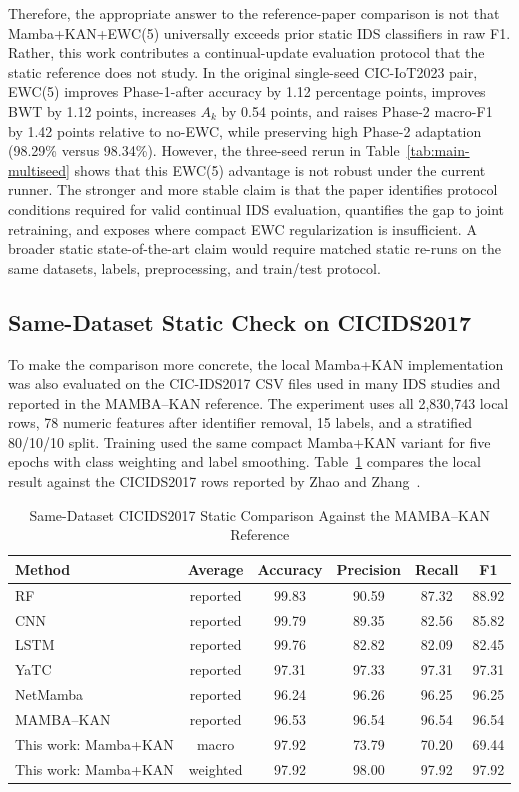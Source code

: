 \documentclass[a4paper,fleqn]{cas-dc}
\begin{document}
Therefore, the appropriate answer to the reference-paper comparison is not that Mamba+KAN+EWC(5) universally exceeds prior static IDS classifiers in raw F1. Rather, this work contributes a continual-update evaluation protocol that the static reference does not study. In the original single-seed CIC-IoT2023 pair, EWC(5) improves Phase-1-after accuracy by 1.12 percentage points, improves BWT by 1.12 points, increases $A_k$ by 0.54 points, and raises Phase-2 macro-F1 by 1.42 points relative to no-EWC, while preserving high Phase-2 adaptation (98.29\% versus 98.34\%). However, the three-seed rerun in Table~\ref{tab:main-multiseed} shows that this EWC(5) advantage is not robust under the current runner. The stronger and more stable claim is that the paper identifies protocol conditions required for valid continual IDS evaluation, quantifies the gap to joint retraining, and exposes where compact EWC regularization is insufficient. A broader static state-of-the-art claim would require matched static re-runs on the same datasets, labels, preprocessing, and train/test protocol.

\subsection{Same-Dataset Static Check on CICIDS2017}
To make the comparison more concrete, the local Mamba+KAN implementation was also evaluated on the CIC-IDS2017 CSV files used in many IDS studies and reported in the MAMBA--KAN reference. The experiment uses all 2,830,743 local rows, 78 numeric features after identifier removal, 15 labels, and a stratified 80/10/10 split. Training used the same compact Mamba+KAN variant for five epochs with class weighting and label smoothing. Table~\ref{tab:cicids2017-static-check} compares the local result against the CICIDS2017 rows reported by Zhao and Zhang~\cite{zhao2025}.

\begin{table}[htbp]
\caption{Same-Dataset CICIDS2017 Static Comparison Against the MAMBA--KAN Reference}
\label{tab:cicids2017-static-check}
\centering
\begin{tabular}{lccccc}
\toprule
Method & Average & Accuracy & Precision & Recall & F1 \\
\midrule
RF~\cite{zhao2025} & reported & 99.83 & 90.59 & 87.32 & 88.92 \\
CNN~\cite{zhao2025} & reported & 99.79 & 89.35 & 82.56 & 85.82 \\
LSTM~\cite{zhao2025} & reported & 99.76 & 82.82 & 82.09 & 82.45 \\
YaTC~\cite{zhao2025} & reported & 97.31 & 97.33 & 97.31 & 97.31 \\
NetMamba~\cite{zhao2025} & reported & 96.24 & 96.26 & 96.25 & 96.25 \\
MAMBA--KAN~\cite{zhao2025} & reported & 96.53 & 96.54 & 96.54 & 96.54 \\
This work: Mamba+KAN & macro & 97.92 & 73.79 & 70.20 & 69.44 \\
This work: Mamba+KAN & weighted & 97.92 & 98.00 & 97.92 & 97.92 \\
\bottomrule
\end{tabular}
\end{table}
\end{document}
